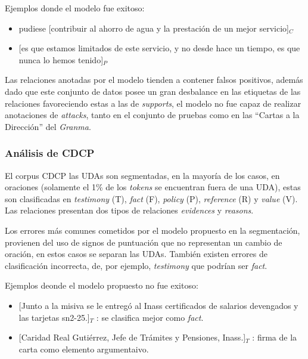 \documentclass{rcci} %
\begin{document}
Ejemplos donde el modelo fue exitoso:
\begin{itemize}
	\item pudiese [contribuir al ahorro de agua y la prestaci\'on de un mejor servicio]$_C$ %
	\item \text{} [es que estamos limitados de este servicio, y no desde hace un tiempo, es que nunca lo hemos tenido]$_P$ %
\end{itemize}

Las relaciones anotadas por el modelo tienden a contener falsos positivos, adem\'as
dado que este conjunto de datos posee un gran desbalance en las etiquetas de las relaciones favoreciendo 
estas a las de \textit{supports}, el modelo no fue capaz de realizar anotaciones de \textit{attacks}, tanto en 
el conjunto de pruebas como en las ``Cartas a la Direcci\'on'' del \textit{Granma}.

\subsubsection*{An\'alisis de CDCP}

El corpus CDCP las UDAs son segmentadas, en la mayor\'ia de los casos, en oraciones 
(solamente el 1\% de los \textit{tokens} se encuentran fuera de una UDA),
estas son clasificadas en \textit{testimony} (T), \textit{fact} (F), \textit{policy} (P), \textit{reference} (R)
y \textit{value} (V). Las relaciones presentan dos tipos de relaciones \textit{evidences} y \textit{reasons}.

Los errores m\'as comunes cometidos por el modelo propuesto en la segmentaci\'on, provienen del uso 
de signos de puntuaci\'on que no representan un cambio de oraci\'on, en estos casos se separan las UDAs. Tambi\'en
existen errores de clasificaci\'on incorrecta, de, por ejemplo, \textit{testimony} que podr\'ian ser \textit{fact}.

Ejemplos deonde el modelo propuesto no fue exitoso:
\begin{itemize}
	\item \text{} [Junto a la misiva se le entreg\'o al Inass certificados de salarios devengados y las tarjetas sn2-25.]$_T$
	      : se clasifica mejor como \textit{fact}. %
	\item \text{} [Caridad Real Guti\'errez, Jefe de Tr\'amites y Pensiones, Inass.]$_T$
	      : firma de la carta como elemento argumentaivo. %
\end{itemize}
\end{document}
